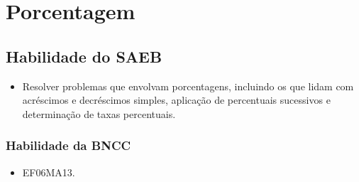 

\chapter{Porcentagem}

\vspace*{-.5cm}
\enlargethispage{3\baselineskip}

\section*{Habilidade do SAEB} 
\begin{itemize}
\item Resolver problemas que envolvam porcentagens,
incluindo os que lidam com acréscimos e decréscimos simples, aplicação
de percentuais sucessivos e determinação de taxas percentuais.
\end{itemize}

\subsection{Habilidade da BNCC} 
\begin{itemize}
\item EF06MA13.
\end{itemize}

